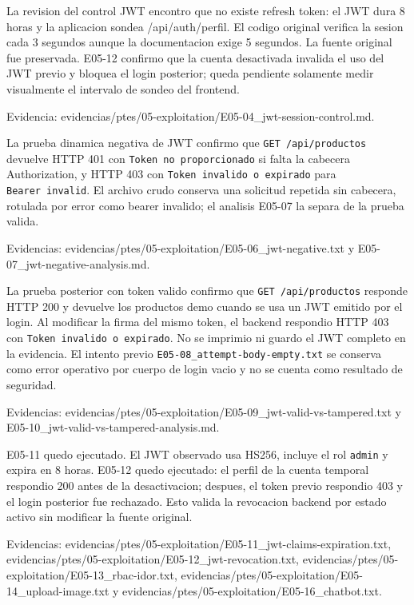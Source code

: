 La revision del control JWT encontro que no existe refresh token: el JWT dura 8 horas y la aplicacion sondea /api/auth/perfil. El codigo original verifica la sesion cada 3 segundos aunque la documentacion exige 5 segundos. La fuente original fue preservada. E05-12 confirmo que la cuenta desactivada invalida el uso del JWT previo y bloquea el login posterior; queda pendiente solamente medir visualmente el intervalo de sondeo del frontend.

Evidencia: evidencias/ptes/05-exploitation/E05-04\_jwt-session-control.md.

La prueba dinamica negativa de JWT confirmo que \texttt{GET\ /api/productos} devuelve HTTP 401 con \texttt{Token\ no\ proporcionado} si falta la cabecera Authorization, y HTTP 403 con \texttt{Token\ invalido\ o\ expirado} para \texttt{Bearer\ invalid}. El archivo crudo conserva una solicitud repetida sin cabecera, rotulada por error como bearer invalido; el analisis E05-07 la separa de la prueba valida.

Evidencias: evidencias/ptes/05-exploitation/E05-06\_jwt-negative.txt y E05-07\_jwt-negative-analysis.md.

La prueba posterior con token valido confirmo que \texttt{GET\ /api/productos} responde HTTP 200 y devuelve los productos demo cuando se usa un JWT emitido por el login. Al modificar la firma del mismo token, el backend respondio HTTP 403 con \texttt{Token\ invalido\ o\ expirado}. No se imprimio ni guardo el JWT completo en la evidencia. El intento previo \texttt{E05-08\_attempt-body-empty.txt} se conserva como error operativo por cuerpo de login vacio y no se cuenta como resultado de seguridad.

Evidencias: evidencias/ptes/05-exploitation/E05-09\_jwt-valid-vs-tampered.txt y E05-10\_jwt-valid-vs-tampered-analysis.md.

E05-11 quedo ejecutado. El JWT observado usa HS256, incluye el rol \texttt{admin} y expira en 8 horas. E05-12 quedo ejecutado: el perfil de la cuenta temporal respondio 200 antes de la desactivacion; despues, el token previo respondio 403 y el login posterior fue rechazado. Esto valida la revocacion backend por estado activo sin modificar la fuente original.

Evidencias: evidencias/ptes/05-exploitation/E05-11\_jwt-claims-expiration.txt, evidencias/ptes/05-exploitation/E05-12\_jwt-revocation.txt, evidencias/ptes/05-exploitation/E05-13\_rbac-idor.txt, evidencias/ptes/05-exploitation/E05-14\_upload-image.txt y evidencias/ptes/05-exploitation/E05-16\_chatbot.txt.

